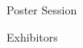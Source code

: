 \documentclass{article}
\newcommand{\room}[1]{
    \noindent
    #1
    \vspace{.2in}

}
\begin{document}
\rssheader[2in]

\vfill

\fontsize{50pt}{60pt}
\selectfont

\begin{center}
\room{Poster Session}
\room{Exhibitors}
\end{center}

\vfill
\end{document}
